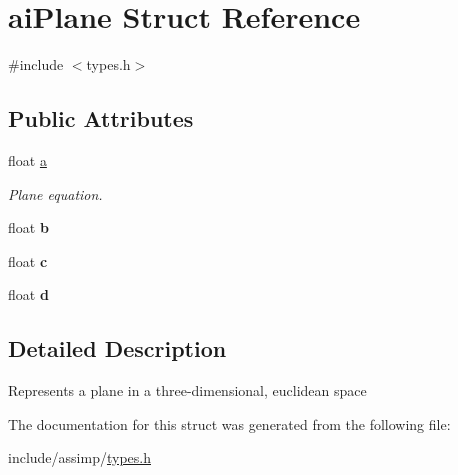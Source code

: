 \hypertarget{structaiPlane}{\section{ai\-Plane \-Struct \-Reference}
\label{structaiPlane}
}


{\ttfamily \#include $<$types.\-h$>$}

\subsection*{\-Public \-Attributes}
\begin{DoxyCompactItemize}
\item 
\hypertarget{structaiPlane_aeadf64e70e6daf1f7f431c90cfc8bce1}{float \hyperlink{structaiPlane_aeadf64e70e6daf1f7f431c90cfc8bce1}{a}}\label{structaiPlane_aeadf64e70e6daf1f7f431c90cfc8bce1}

\begin{DoxyCompactList}\small\item\em \-Plane equation. \end{DoxyCompactList}\item 
\hypertarget{structaiPlane_a84ab33cd9b2f5325282b489f8a2bf11c}{float {\bfseries b}}\label{structaiPlane_a84ab33cd9b2f5325282b489f8a2bf11c}

\item 
\hypertarget{structaiPlane_a7b0ea36c355ca003a5789088fb24da1f}{float {\bfseries c}}\label{structaiPlane_a7b0ea36c355ca003a5789088fb24da1f}

\item 
\hypertarget{structaiPlane_ab8696b583b6fab46ae30cd5b691e7c9a}{float {\bfseries d}}\label{structaiPlane_ab8696b583b6fab46ae30cd5b691e7c9a}

\end{DoxyCompactItemize}


\subsection{\-Detailed \-Description}
\-Represents a plane in a three-\/dimensional, euclidean space 

\-The documentation for this struct was generated from the following file\-:\begin{DoxyCompactItemize}
\item 
include/assimp/\hyperlink{types_8h}{types.\-h}\end{DoxyCompactItemize}
